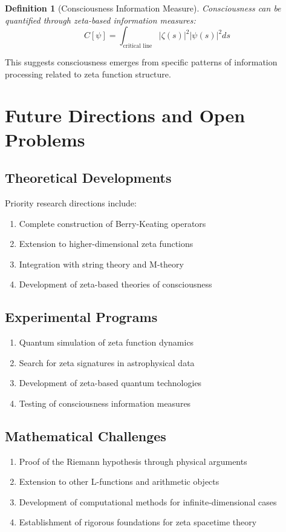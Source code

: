 \documentclass[12pt]{article}
\newtheorem{definition}[theorem]{Definition}
\begin{document}
\begin{definition}[Consciousness Information Measure]
Consciousness can be quantified through zeta-based information measures:
$$C[\psi] = \int_{\text{critical line}} |\zeta(s)|^2 |\psi(s)|^2 ds$$
\end{definition}

This suggests consciousness emerges from specific patterns of information processing related to zeta function structure.

\section{Future Directions and Open Problems}

\subsection{Theoretical Developments}

Priority research directions include:

\begin{enumerate}
\item Complete construction of Berry-Keating operators
\item Extension to higher-dimensional zeta functions
\item Integration with string theory and M-theory
\item Development of zeta-based theories of consciousness
\end{enumerate}

\subsection{Experimental Programs}

\begin{enumerate}
\item Quantum simulation of zeta function dynamics
\item Search for zeta signatures in astrophysical data
\item Development of zeta-based quantum technologies
\item Testing of consciousness information measures
\end{enumerate}

\subsection{Mathematical Challenges}

\begin{enumerate}
\item Proof of the Riemann hypothesis through physical arguments
\item Extension to other L-functions and arithmetic objects
\item Development of computational methods for infinite-dimensional cases
\item Establishment of rigorous foundations for zeta spacetime theory
\end{enumerate}
\end{document}
